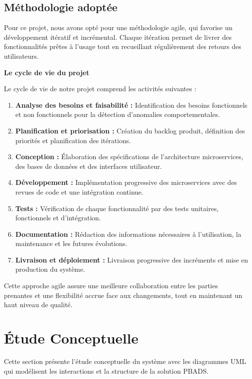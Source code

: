 \subsection{Méthodologie adoptée}

Pour ce projet, nous avons opté pour une méthodologie agile, qui favorise un développement itératif et incrémental. Chaque itération permet de livrer des fonctionnalités prêtes à l'usage tout en recueillant régulièrement des retours des utilisateurs.

\textbf{Le cycle de vie du projet}

Le cycle de vie de notre projet comprend les activités suivantes :

\begin{enumerate}
    \item \textbf{Analyse des besoins et faisabilité :} Identification des besoins fonctionnels et non fonctionnels pour la détection d'anomalies comportementales.
    \item \textbf{Planification et priorisation :} Création du backlog produit, définition des priorités et planification des itérations.
    \item \textbf{Conception :} Élaboration des spécifications de l'architecture microservices, des bases de données et des interfaces utilisateur.
    \item \textbf{Développement :} Implémentation progressive des microservices avec des revues de code et une intégration continue.
    \item \textbf{Tests :} Vérification de chaque fonctionnalité par des tests unitaires, fonctionnels et d'intégration.
    \item \textbf{Documentation :} Rédaction des informations nécessaires à l'utilisation, la maintenance et les futures évolutions.
    \item \textbf{Livraison et déploiement :} Livraison progressive des incréments et mise en production du système.
\end{enumerate}

Cette approche agile assure une meilleure collaboration entre les parties prenantes et une flexibilité accrue face aux changements, tout en maintenant un haut niveau de qualité.

\section{Étude Conceptuelle}

Cette section présente l'étude conceptuelle du système avec les diagrammes UML qui modélisent les interactions et la structure de la solution PBADS.

